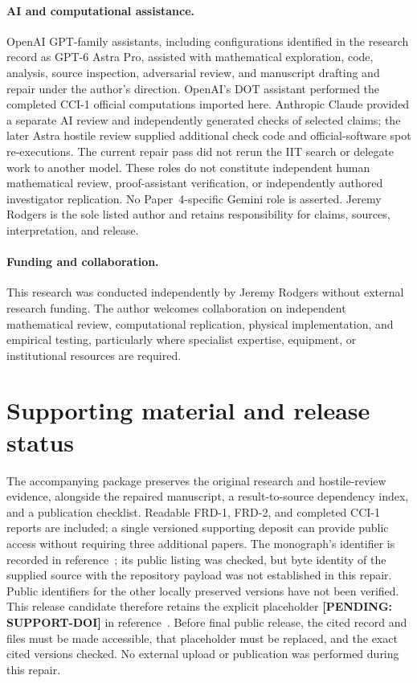 \documentclass[11pt]{article}
\newcommand{\supportpending}{\textbf{[PENDING: SUPPORT-DOI]}}
\theoremstyle{definition}\newtheorem{definition}[theorem]{Definition}
\theoremstyle{remark}\newtheorem{remark}[theorem]{Remark}
\begin{document}
\paragraph{AI and computational assistance.}
OpenAI GPT-family assistants, including configurations identified in the research record as GPT-6 Astra Pro, assisted with mathematical exploration, code, analysis, source inspection, adversarial review, and manuscript drafting and repair under the author's direction. OpenAI's DOT assistant performed the completed CCI-1 official computations imported here. Anthropic Claude provided a separate AI review and independently generated checks of selected claims; the later Astra hostile review supplied additional check code and official-software spot re-executions. The current repair pass did not rerun the IIT search or delegate work to another model. These roles do not constitute independent human mathematical review, proof-assistant verification, or independently authored investigator replication. No Paper~4-specific Gemini role is asserted. Jeremy Rodgers is the sole listed author and retains responsibility for claims, sources, interpretation, and release.

\paragraph{Funding and collaboration.}
This research was conducted independently by Jeremy Rodgers without external research funding. The author welcomes collaboration on independent mathematical review, computational replication, physical implementation, and empirical testing, particularly where specialist expertise, equipment, or institutional resources are required.

\section*{Supporting material and release status}
The accompanying package preserves the original research and hostile-review evidence, alongside the repaired manuscript, a result-to-source dependency index, and a publication checklist. Readable FRD-1, FRD-2, and completed CCI-1 reports are included; a single versioned supporting deposit can provide public access without requiring three additional papers. The monograph's identifier is recorded in reference~\cite{mono}; its public listing was checked, but byte identity of the supplied source with the repository payload was not established in this repair. Public identifiers for the other locally preserved versions have not been verified. This release candidate therefore retains the explicit placeholder \supportpending{} in reference~\cite{support}. Before final public release, the cited record and files must be made accessible, that placeholder must be replaced, and the exact cited versions checked. No external upload or publication was performed during this repair.
\end{document}
